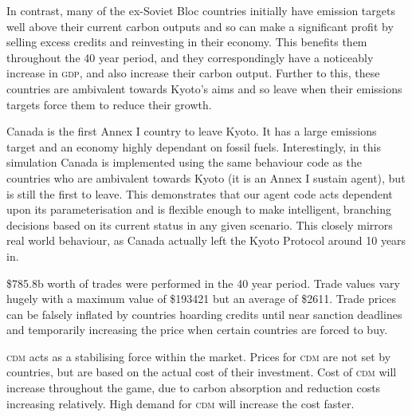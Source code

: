 In contrast, many of the ex-Soviet Bloc countries initially have emission targets well above their current carbon outputs and so can make a significant profit by selling excess credits and reinvesting in their economy. This benefits them throughout the 40 year period, and they correspondingly have a noticeably increase in \textsc{gdp}, and also increase their carbon output. Further to this, these countries are ambivalent towards Kyoto’s aims and so leave when their emissions targets force them to reduce their growth.

Canada is the first Annex I country to leave Kyoto. It has a large emissions target and an economy highly dependant on fossil fuels. Interestingly, in this simulation Canada is implemented using the same behaviour code as the countries who are ambivalent towards Kyoto (it is an Annex I sustain agent), but is still the first to leave. This demonstrates that our agent code acts dependent upon its parameterisation and is flexible enough to make intelligent, branching decisions based on its current status in any given scenario. This closely mirrors real world behaviour, as Canada actually left the Kyoto Protocol around 10 years in.

\$785.8b worth of trades were performed in the 40 year period. Trade values vary hugely with a maximum value of \$193421 but an average of \$2611. Trade prices can be falsely inflated by countries hoarding credits until near sanction deadlines and temporarily increasing the price when certain countries are forced to buy.

\textsc{cdm} acts as a stabilising force within the market. Prices for \textsc{cdm} are not set by countries, but are based on the actual cost of their investment. Cost of \textsc{cdm} will increase throughout the game, due to carbon absorption and reduction costs increasing relatively. High demand for \textsc{cdm} will increase the cost faster.

